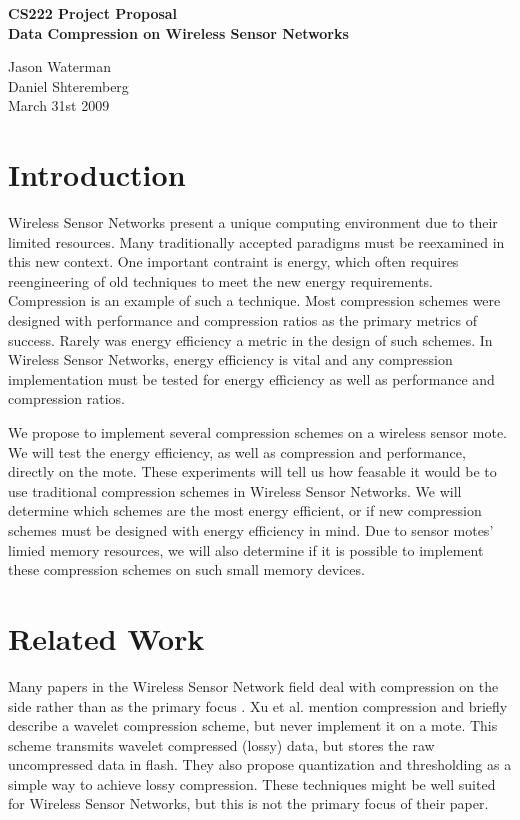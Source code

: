 \documentclass[10pt]{article}
\begin{document}
\begin{center}
\Large\textbf{CS222 Project Proposal \\ Data Compression on Wireless Sensor Networks}

\bigskip

Jason Waterman \\ Daniel Shteremberg \\
\medskip
March 31st 2009
\end{center}

\section{Introduction}

Wireless Sensor Networks present a unique computing environment due to
their limited resources. Many traditionally accepted paradigms must be
reexamined in this new context. One important contraint is energy,
which often requires reengineering of old techniques to meet the new
energy requirements. Compression is an example of such a
technique. Most compression schemes were designed with performance and
compression ratios as the primary metrics of success. Rarely was
energy efficiency a metric in the design of such schemes. In Wireless
Sensor Networks, energy efficiency is vital and any compression
implementation must be tested for energy efficiency as well as
performance and compression ratios. 

We propose to implement several compression schemes on a wireless
sensor mote. We will test the energy efficiency, as well as
compression and performance, directly on the mote. These experiments
will tell us how feasable it would be to use traditional compression
schemes in Wireless Sensor Networks. We will determine which schemes
are the most energy efficient, or if new compression schemes must be
designed with energy efficiency in mind. Due to sensor motes' limied
memory resources, we will also determine if it is possible to
implement these compression schemes on such small memory devices. 

\section{Related Work}

Many papers in the Wireless Sensor Network field deal with compression
on the side rather than as the primary focus
\cite{habitat}\cite{structural}. Xu et al. \cite{structural} mention
compression and briefly describe a wavelet compression scheme, but
never implement it on a mote. This scheme transmits wavelet
compressed (lossy) data, but stores the raw uncompressed data in
flash. They also propose quantization and thresholding as a simple way
to achieve lossy compression. These techniques might be well suited
for Wireless Sensor Networks, but this is not the primary focus of
their paper.
\end{document}
